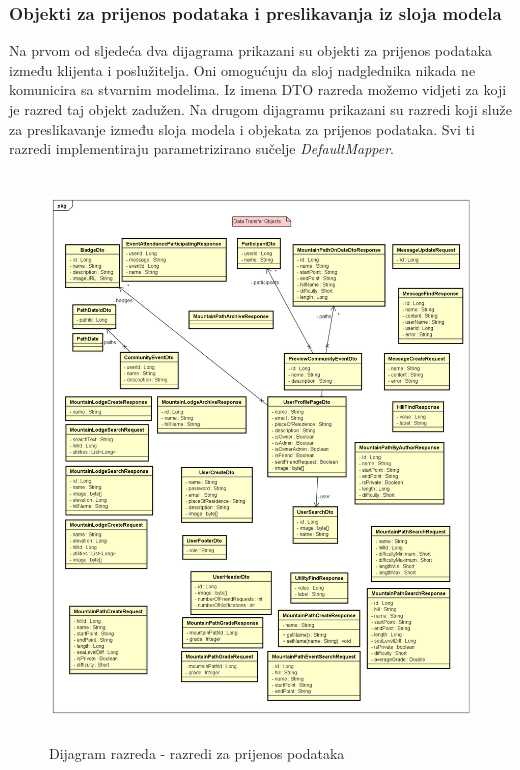 			\subsubsection{Objekti za prijenos podataka i preslikavanja iz sloja modela}
			Na prvom od sljedeća dva dijagrama prikazani su objekti za prijenos podataka između klijenta i poslužitelja. Oni omogućuju da sloj nadglednika nikada ne komunicira sa stvarnim modelima. Iz imena DTO razreda možemo vidjeti za koji je razred taj objekt zadužen. Na drugom dijagramu prikazani su razredi koji služe za preslikavanje između sloja modela i objekata za prijenos podataka. Svi ti razredi implementiraju parametrizirano sučelje \textit{DefaultMapper}.
			\begin{figure}[H]
				\includegraphics[scale=0.6, height=150mm, width=165mm]{dijagrami/dto-dijagram.png} %
				\centering
				\caption{Dijagram razreda - razredi za prijenos podataka}
				\label{fig:dijagrami_razreda3}
			\end{figure}
